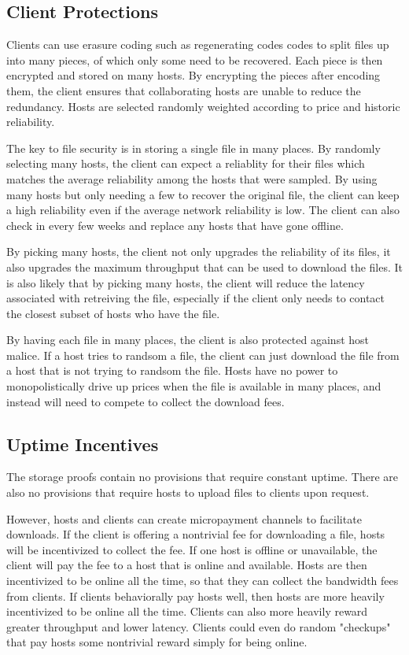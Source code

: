 \documentclass[twocolumn]{article}
\begin{document}
\subsection{Client Protections}
Clients can use erasure coding such as regenerating codes \cite{reg} codes to split files up into many pieces, of which only some need to be recovered.
Each piece is then encrypted and stored on many hosts.
By encrypting the pieces after encoding them, the client ensures that collaborating hosts are unable to reduce the redundancy.
Hosts are selected randomly weighted according to price and historic reliability.

The key to file security is in storing a single file in many places.
By randomly selecting many hosts, the client can expect a reliablity for their files which matches the average reliability among the hosts that were sampled.
By using many hosts but only needing a few to recover the original file, the client can keep a high reliability even if the average network reliability is low.
The client can also check in every few weeks and replace any hosts that have gone offline.

By picking many hosts, the client not only upgrades the reliability of its files, it also upgrades the maximum throughput that can be used to download the files.
It is also likely that by picking many hosts, the client will reduce the latency associated with retreiving the file, especially if the client only needs to contact the closest subset of hosts who have the file.

By having each file in many places, the client is also protected against host malice.
If a host tries to randsom a file, the client can just download the file from a host that is not trying to randsom the file.
Hosts have no power to monopolistically drive up prices when the file is available in many places, and instead will need to compete to collect the download fees.

\subsection{Uptime Incentives}
The storage proofs contain no provisions that require constant uptime.
There are also no provisions that require hosts to upload files to clients upon request.

However, hosts and clients can create micropayment channels to facilitate downloads.
If the client is offering a nontrivial fee for downloading a file, hosts will be incentivized to collect the fee.
If one host is offline or unavailable, the client will pay the fee to a host that is online and available.
Hosts are then incentivized to be online all the time, so that they can collect the bandwidth fees from clients.
If clients behaviorally pay hosts well, then hosts are more heavily incentivized to be online all the time.
Clients can also more heavily reward greater throughput and lower latency.
Clients could even do random "checkups" that pay hosts some nontrivial reward simply for being online.
\end{document}
